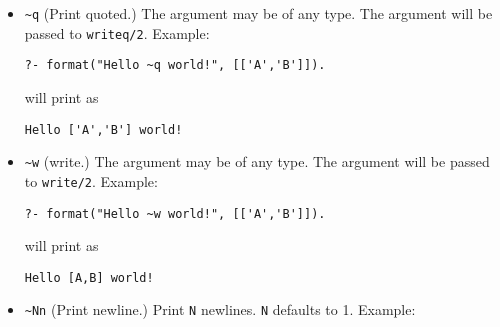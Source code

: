 \begin{description}
\begin{itemize}

\item \verb|~q|
(Print quoted.) The argument may be of any type.  The argument will be
passed to {\tt writeq/2}.  Example:

\begin{verbatim}
?- format("Hello ~q world!", [['A','B']]).
\end{verbatim}

\noindent
will print as

\begin{verbatim}
Hello ['A','B'] world!
\end{verbatim}

\item \verb|~w|
(write.) The argument may be of any type.  The argument will be passed
to {\tt write/2}.  Example:

\begin{verbatim}
?- format("Hello ~w world!", [['A','B']]).
\end{verbatim}

\noindent
will print as

\begin{verbatim}
Hello [A,B] world!
\end{verbatim}

\item \verb|~Nn|
(Print newline.) Print {\tt N} newlines. {\tt N} defaults to 1.
Example:


\end{itemize}
\end{description}
